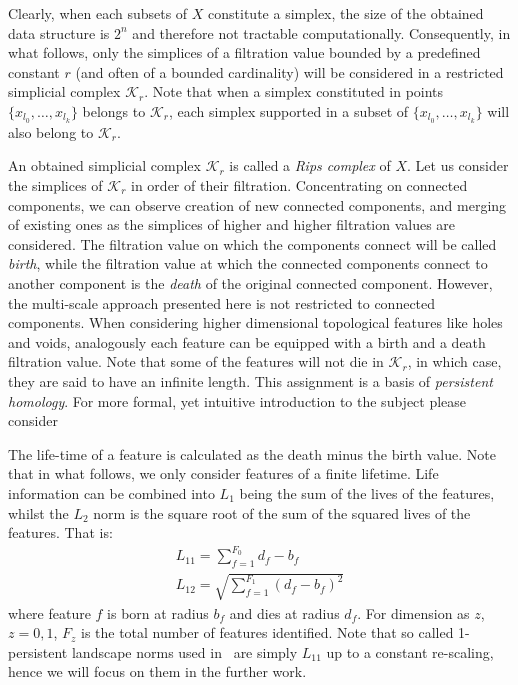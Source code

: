 \documentclass{article}
\begin{document}
Clearly, when each subsets of $X$ constitute a simplex, the size of the obtained data structure is $2^n$ and therefore not tractable computationally. Consequently, in what follows, only the simplices of a filtration value bounded by a predefined constant $r$ (and often of a bounded cardinality) will be considered in a restricted simplicial complex $\mathcal{K}_r$. Note that when a simplex constituted in points $\{x_{l_0},\ldots,x_{l_k}\}$ belongs to $\mathcal{K}_r$, each simplex supported in a subset of $\{x_{l_0},\ldots,x_{l_k}\}$ will also belong to $\mathcal{K}_r$.

An obtained simplicial complex $\mathcal{K}_r$ is called a \emph{Rips complex} of $X$. Let us consider the simplices of $\mathcal{K}_r$ in order of their filtration. Concentrating on connected components, we can observe creation of new connected components, and merging of existing ones as the simplices of higher and higher filtration values are considered. The filtration value on which the components connect will be called \emph{birth}, while the filtration value at which the connected components connect to another component is the \emph{death} of the original connected component. However, the multi-scale approach presented here is not restricted to connected components. When considering higher dimensional topological features like holes and voids, analogously each feature can be equipped with a birth and a death filtration value. Note that some of the features will not die in $\mathcal{K}_r$, in which case, they are said to have an infinite length. This assignment is a basis of \emph{persistent homology}. For more formal, yet intuitive introduction to the subject please consider~\cite{carlsson2009topology}

The life-time of a feature is calculated as the death minus the birth value. Note that in what follows, we only consider features of a finite lifetime. Life information can be combined into $L_1$ being the sum of the lives of the features, whilst the $L_2$ norm is the square root of the sum of the squared lives of the features. That is:
\begin{align}
    L_{11} = \sum_{f=1}^{F_0} d_f-b_f \\
    L_{12} = \sqrt{\sum_{f=1}^{F_1} (d_f-b_f)^2 }
\end{align}
where feature $f$ is born at radius $b_f$ and dies at radius $d_f$. For dimension as $z$, $z=0,1$, $F_z$ is the total number of features identified. Note that so called 1-persistent landscape norms used in~\cite{gidea2018topological} are simply $L_{11}$ up to a constant re-scaling, hence we will focus on them in the further work. 
\end{document}
